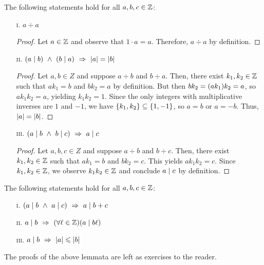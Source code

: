 \begin{lemma}\label{lem:divpartial}
    The following statements hold for all $a, b, c \in \mathbb{Z}$:
    \begin{enumerate}
        \item[\textsc{i}.]
            $a \div a$
            \begin{proof}
                Let $a \in \mathbb{Z}$ and observe that $1 \cdot a = a$.
                Therefore, $a \div a$ by definition.
            \end{proof}
        \item[\textsc{ii}.]
            $\pn*{a \div b} ~\meet~ \pn*{b \div a} \implies \abs{a} = \abs{b}$
            \begin{proof}
                Let $a, b \in Z$ and suppose $a \div b$ and $b \div a$.
                Then, there exist $k_1, k_2 \in \mathbb{Z}$ such that $ak_1 = b$ and $bk_2 = a$ by definition.
                But then $bk_2 = \pn*{ak_1}k_2 = a$, so $ak_1k_2 = a$, yielding $k_1k_2 = 1$.
                Since the only integers with multiplicative inverses are $1$ and $-1$,
                we have $\set*{k_1, k_2} \subseteq \set*{1, -1}$,
                so $a = b$ or $a = -b$.
                Thus, $\lvert a\rvert = \lvert b\rvert$.
            \end{proof}
        \item[\textsc{iii}.]
            $\pn*{a \div b ~\meet~ b \div c} \implies a \div c$
            \begin{proof}
                Let $a, b, c \in Z$ and suppose $a \div b$ and $b \div c$.
                Then, there exist $k_1, k_2 \in \mathbb{Z}$ such that $ak_1 = b$ and $bk_2 = c$.
                This yields $ak_1k_2 = c$.
                Since $k_1, k_2 \in \mathbb{Z}$,
                we observe $k_1k_2 \in \mathbb{Z}$ and conclude $a \mid c$ by definition.
            \end{proof}
    \end{enumerate}
\end{lemma}

\begin{lemma}\label{lem:divalgebra}
    The following statements hold for all $a, b, c \in \mathbb{Z}$:
    \begin{enumerate}
        \item[\textsc{i}.]
            $\pn*{a \div b ~\meet~ a \div c} \implies a \div b + c$
        \item[\textsc{ii}.]
            $a \div b \implies \pn*{\forall \ell \in \Z}\pn*{a \div b\ell}$
        \item[\textsc{iii}.]
            $a \mid b ~\Rightarrow~ \lvert a\rvert \leqslant \lvert b\rvert$
    \end{enumerate}
    The proofs of the above lemmata are left as exercises to the reader.
\end{lemma}

